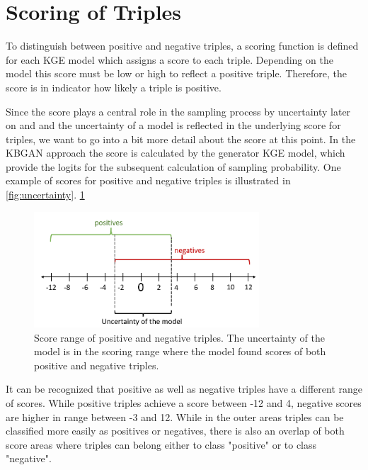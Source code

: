 \section{Scoring of Triples} \label{sec:scoring_of_triples}

To distinguish between positive and negative triples, a scoring function is defined for each \ac{KGE} model which assigns a score to each triple.
Depending on the model this score must be low or high to reflect a positive triple.
Therefore, the score is in indicator how likely a triple is positive.

Since the score plays a central role in the sampling process by uncertainty later on and and the uncertainty of a model is reflected in the underlying score for triples, we want to go into a bit more detail about the score at this point.
In the KBGAN approach the score is calculated by the generator \ac{KGE} model, which provide the logits for the subsequent calculation of sampling probability.
One example of scores for positive and negative triples is illustrated in \autoref{fig:uncertainty}.
\ref{fig:uncertainty}
\begin{figure}[t]
  \centering
    \includegraphics[width=0.75\textwidth]{figures/uncertainty.PNG}
  \caption{Score range of positive and negative triples.
  The uncertainty of the model is in the scoring range where the model found scores of both positive and negative triples.}
  \label{fig:uncertainty}
\end{figure}
It can be recognized that positive as well as negative triples have a different range of scores.
While positive triples achieve a score between -12 and 4, negative scores are higher in range between -3 and 12.
While in the outer areas triples can be classified more easily as positives or negatives, there is also an overlap of both score areas where triples can belong either to class "positive" or to class "negative".










